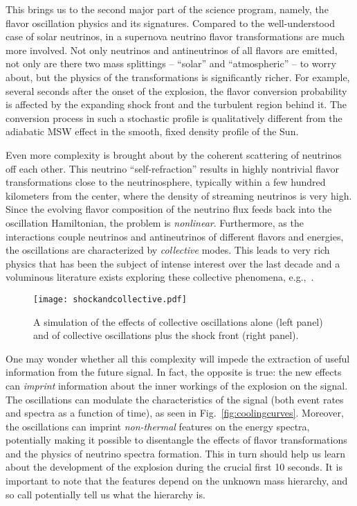 This brings us to the second major part of the science program, namely, the flavor oscillation physics and its signatures. Compared to the well-understood case of solar neutrinos, in a supernova neutrino flavor transformations are much more involved. Not only neutrinos and antineutrinos of all flavors are emitted, not only are there two mass splittings -- ``solar'' and ``atmospheric'' -- to worry about, but the physics of the transformations is significantly richer. For example, several seconds after the onset of the explosion, the flavor conversion probability is affected by the expanding shock front and the turbulent region behind it. The conversion process in such a stochastic profile is qualitatively different from the adiabatic MSW effect in the smooth, fixed density profile of the Sun. 

Even more complexity is brought about by the coherent scattering of neutrinos off each other. This neutrino ``self-refraction'' 
 results in highly nontrivial flavor transformations close to the neutrinosphere, typically within a few hundred kilometers from the center, where the density of streaming neutrinos is very high. Since the evolving flavor composition of the neutrino flux feeds back into the oscillation Hamiltonian, the problem is \emph{nonlinear}. Furthermore, as the interactions couple neutrinos and antineutrinos of different flavors and energies, the oscillations are characterized by \emph{collective} modes. This leads to very rich physics that has been the subject of intense interest over the last decade and a voluminous literature exists exploring these collective phenomena,
e.g.,~\cite{Duan:2005cp,Fogli:2007bk,Raffelt:2007cb,Raffelt:2007xt,EstebanPretel:2008ni,Duan:2009cd,Dasgupta:2009mg,Duan:2010bg,Duan:2010bf,Wu:2014kaa}.

\begin{figure}[!htb]
\centering
\texttt{[image: shockandcollective.pdf]}
\caption[Simulated cooling curves from the Garching light progenitor model]{ A simulation of the effects of collective oscillations alone (left panel) and of collective oscillations plus the shock front (right panel).}
\label{fig:shockandcollective}
\end{figure}

One may wonder whether all this complexity will impede the extraction of useful information from the future signal. In fact, the opposite is true: the new effects can \emph{imprint} information about the inner workings of the explosion on the signal. The oscillations can modulate the characteristics of the signal (both event rates and spectra as a function of time), as seen in Fig.~\ref{fig:coolingcurves}. Moreover, the oscillations can imprint \emph{non-thermal} features on the energy spectra, potentially making it possible to disentangle the effects of flavor transformations and the physics of neutrino spectra formation. This in turn should help us learn about the development of the explosion during the crucial first 10 seconds.   It is important to note that the features depend on the unknown mass hierarchy, and so call potentially tell us what the hierarchy is.

